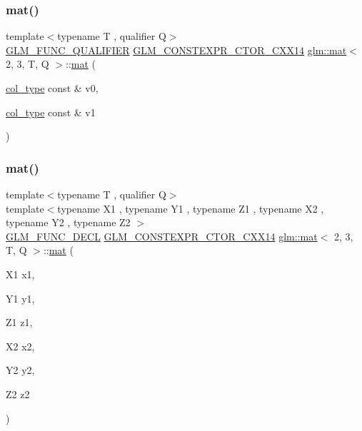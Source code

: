\mbox{\label{structglm_1_1mat_3_012_00_013_00_01_t_00_01_q_01_4_a22d92a487e563cf3508f509c001c910d}} 
\subsubsection{\texorpdfstring{mat()}{mat()}\hspace{0.1cm}{\footnotesize\ttfamily [6/21]}}
{\footnotesize\ttfamily template$<$typename T , qualifier Q$>$ \\
\hyperlink{setup_8hpp_a33fdea6f91c5f834105f7415e2a64407}{G\+L\+M\+\_\+\+F\+U\+N\+C\+\_\+\+Q\+U\+A\+L\+I\+F\+I\+ER} \hyperlink{setup_8hpp_a0900f9145e68bf6061b6f5e7be3fa751}{G\+L\+M\+\_\+\+C\+O\+N\+S\+T\+E\+X\+P\+R\+\_\+\+C\+T\+O\+R\+\_\+\+C\+X\+X14} \hyperlink{structglm_1_1mat}{glm\+::mat}$<$ 2, 3, T, Q $>$\+::\hyperlink{structglm_1_1mat}{mat} (\begin{DoxyParamCaption}\item[{\hyperlink{structglm_1_1mat_3_012_00_013_00_01_t_00_01_q_01_4_aebe4faf14ea1bc3092b4bbf591d7194e}{col\+\_\+type} const \&}]{v0,  }\item[{\hyperlink{structglm_1_1mat_3_012_00_013_00_01_t_00_01_q_01_4_aebe4faf14ea1bc3092b4bbf591d7194e}{col\+\_\+type} const \&}]{v1 }\end{DoxyParamCaption})}

\mbox{\label{structglm_1_1mat_3_012_00_013_00_01_t_00_01_q_01_4_a142d33e21b0df676faae8f39aa6866b0}} 
\subsubsection{\texorpdfstring{mat()}{mat()}\hspace{0.1cm}{\footnotesize\ttfamily [7/21]}}
{\footnotesize\ttfamily template$<$typename T , qualifier Q$>$ \\
template$<$typename X1 , typename Y1 , typename Z1 , typename X2 , typename Y2 , typename Z2 $>$ \\
\hyperlink{setup_8hpp_ab2d052de21a70539923e9bcbf6e83a51}{G\+L\+M\+\_\+\+F\+U\+N\+C\+\_\+\+D\+E\+CL} \hyperlink{setup_8hpp_a0900f9145e68bf6061b6f5e7be3fa751}{G\+L\+M\+\_\+\+C\+O\+N\+S\+T\+E\+X\+P\+R\+\_\+\+C\+T\+O\+R\+\_\+\+C\+X\+X14} \hyperlink{structglm_1_1mat}{glm\+::mat}$<$ 2, 3, T, Q $>$\+::\hyperlink{structglm_1_1mat}{mat} (\begin{DoxyParamCaption}\item[{X1}]{x1,  }\item[{Y1}]{y1,  }\item[{Z1}]{z1,  }\item[{X2}]{x2,  }\item[{Y2}]{y2,  }\item[{Z2}]{z2 }\end{DoxyParamCaption})}

